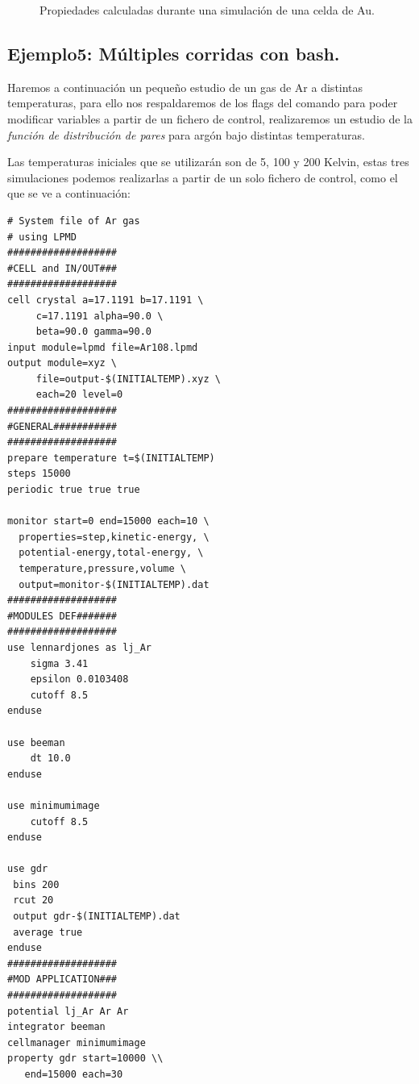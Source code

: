 \begin{figure}[h!]
{ \label{fig:aucnf}
}
\caption{Propiedades calculadas durante una simulaci\'on de una celda de Au.}
\label{fig:auprop}
\end{figure}



\subsection{Ejemplo5: M\'ultiples corridas con bash.}

Haremos a continuaci\'on un peque\~no estudio de un gas de Ar a distintas temperaturas, para ello nos respaldaremos de los flags del comando {\lpmd} para poder modificar variables a partir de un fichero de control, realizaremos un estudio de la \textit{funci\'on de distribuci\'on de pares} para arg\'on bajo distintas temperaturas.

Las temperaturas iniciales que se utilizar\'an son de 5, 100 y 200 Kelvin, estas tres simulaciones podemos realizarlas a partir de un solo fichero de control, como el que se ve a continuaci\'on:

\begin{multicols}{2}
\setlength{\columnseprule}{.5pt}
\begin{verbatim}
# System file of Ar gas 
# using LPMD
###################
#CELL and IN/OUT###
###################
cell crystal a=17.1191 b=17.1191 \
     c=17.1191 alpha=90.0 \
     beta=90.0 gamma=90.0
input module=lpmd file=Ar108.lpmd
output module=xyz \
     file=output-$(INITIALTEMP).xyz \
     each=20 level=0
###################
#GENERAL###########
###################
prepare temperature t=$(INITIALTEMP)
steps 15000
periodic true true true

monitor start=0 end=15000 each=10 \
  properties=step,kinetic-energy, \
  potential-energy,total-energy, \
  temperature,pressure,volume \
  output=monitor-$(INITIALTEMP).dat
###################
#MODULES DEF#######
###################
use lennardjones as lj_Ar
    sigma 3.41
    epsilon 0.0103408
    cutoff 8.5
enduse

use beeman
    dt 10.0
enduse

use minimumimage
    cutoff 8.5
enduse

use gdr
 bins 200
 rcut 20
 output gdr-$(INITIALTEMP).dat
 average true
enduse
###################
#MOD APPLICATION###
###################
potential lj_Ar Ar Ar
integrator beeman
cellmanager minimumimage
property gdr start=10000 \\
   end=15000 each=30
\end{verbatim}
\end{multicols}

